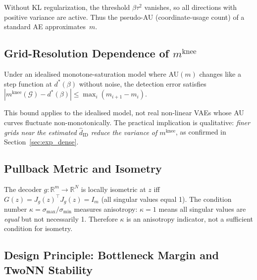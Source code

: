\documentclass[make,article,submit,pdftex,moreauthors]{Definitions/mdpi}
\newcommand{\Jg}{J_g}
\newcommand{\R}{\mathbb{R}}
\newcommand{\kap}{\kappa}
\newcommand{\mknee}{m^{\mathrm{knee}}}
\newcommand{\hatdID}{\hat{d}_{\mathrm{ID}}}
\begin{document}
\begin{remark}[Vanilla AE corresponds to $\beta=0$]
Without KL regularization, the threshold $\beta\tau^2$ vanishes, so all
directions with positive variance are active.  Thus the pseudo-AU
(coordinate-usage count) of a standard AE approximates~$m$.
\end{remark}

\subsection{\texorpdfstring{Grid-Resolution Dependence of $\mknee$}{Grid-Resolution Dependence of m\_knee}}\label{sec:theory_grid}

\begin{proposition}\label{thm:mknee_instab}
Under an idealised monotone-saturation model where AU$(m)$ changes like a step
function at $d^*(\beta)$ without noise, the detection error satisfies
$|\mknee(\mathcal{G})-d^*(\beta)|\leq\max_i(m_{i+1}-m_i)$.
\end{proposition}

\begin{remark}
This bound applies to the idealised model, not real non-linear VAEs whose AU
curves fluctuate non-monotonically.
The practical implication is qualitative: \emph{finer grids near the estimated
$\hatdID$ reduce the variance of $\mknee$}, as confirmed in Section~\ref{sec:exp_dense}.
\end{remark}

\subsection{Pullback Metric and Isometry}\label{sec:theory_pullback}

\begin{proposition}\label{thm:pullback}
The decoder $g:\R^m\!\to\R^N$ is locally isometric at $z$ iff
$G(z)=\Jg(z)^\top\Jg(z)=I_m$ (all singular values equal 1).
The condition number $\kap=\sigma_{\max}/\sigma_{\min}$ measures anisotropy:
$\kap=1$ means all singular values are \emph{equal} but not necessarily 1.
Therefore $\kap$ is an anisotropy indicator, not a sufficient condition for isometry.
\end{proposition}

\subsection{Design Principle: Bottleneck Margin and TwoNN Stability}
\label{sec:theory_dp}
\end{document}
